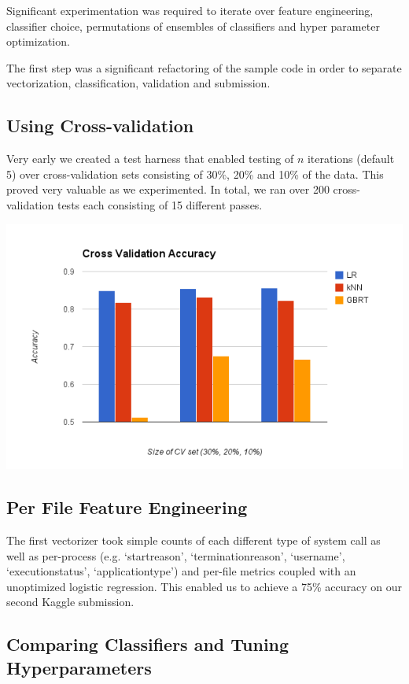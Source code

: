 \documentclass[11pt, oneside]{article}   	%
\begin{document}
Significant experimentation was required to iterate over feature engineering, classifier choice, permutations of ensembles of classifiers and hyper parameter optimization.

The first step was a significant refactoring of the sample code in order to separate vectorization, classification, validation and submission.

\subsection*{Using Cross-validation}

Very early we created a test harness that enabled testing of $n$ iterations (default 5) over cross-validation sets consisting of 30\%, 20\% and 10\% of the data. This proved very valuable as we experimented. In total, we ran over 200 cross-validation tests each consisting of 15 different passes.
\begin{center}
\includegraphics[scale=.6]{cv_error}
\end{center}

\subsection*{Per File Feature Engineering}

The first vectorizer took simple counts of each different type of system call as well as per-process (e.g. `startreason', `terminationreason', `username', `executionstatus', `applicationtype') and per-file metrics coupled with an unoptimized logistic regression. This enabled us to achieve a 75\% accuracy on our second Kaggle submission.

\subsection*{Comparing Classifiers and Tuning Hyperparameters}
\end{document}
